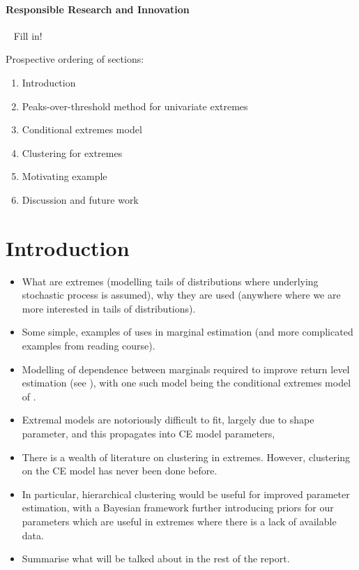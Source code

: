 \documentclass{article}
\numberwithin{equation}{section}
\begin{document}
\begin{center}
\paragraph{Responsible Research and Innovation} ~\linebreak
{}
Fill in!

\end{center}

\newpage

\tableofcontents

\newpage

Prospective ordering of sections:
\begin{enumerate}
  \item Introduction
  \item Peaks-over-threshold method for univariate extremes
  \item Conditional extremes model
  \item Clustering for extremes
  \item Motivating example
  \item Discussion and future work
\end{enumerate}

\section{Introduction}\label{sec:intro}


\begin{itemize}
  \item What are extremes (modelling tails of distributions where underlying stochastic process is assumed), why they are used (anywhere where we are more interested in tails of distributions). 
  \item Some simple, examples of uses in marginal estimation (and more complicated examples from reading course).
  \item Modelling of dependence between marginals required to improve return level estimation (see \cite{Winter2016}), with one such model being the conditional extremes model of \cite{Heffernan2004}. 
  \item Extremal models are notoriously difficult to fit, largely due to shape parameter, and this propagates into CE model parameters,
  \item There is a wealth of literature on clustering in extremes. However, clustering on the CE model has never been done before. 
  \item In particular, hierarchical clustering would be useful for improved parameter estimation, with a Bayesian framework further introducing priors for our parameters which are useful in extremes where there is a lack of available data. 
  \item Summarise what will be talked about in the rest of the report.
\end{itemize}
\end{document}
